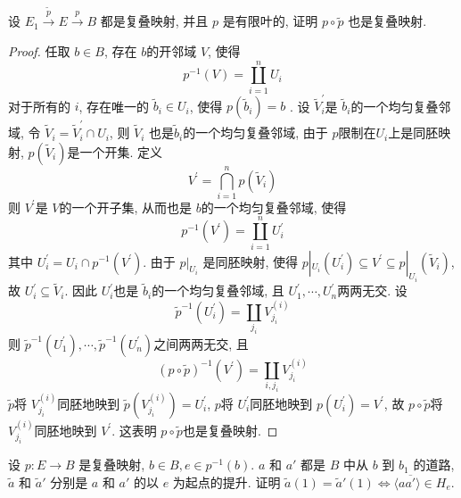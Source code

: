\documentclass[../main.tex]{subfiles}
\begin{document}
\begin{exercise}{}{}
设 $E_1 \xrightarrow{\tilde{p}} E \xrightarrow{p} B$ 都是复叠映射, 并且 $p$ 是有限叶的, 证明 $p \circ \tilde{p}$ 也是复叠映射.
\end{exercise}
\begin{proof}
    任取 \(  b\in B  \), 存在 \(  b  \)的开邻域 \(  V  \), 使得 \[
    p^{-1} \left( V \right)= \coprod  _{i= 1}^{n}U_{i} 
    \]
   对于所有的 \(  i  \), 存在唯一的 \(  \tilde{b}_{i}\in U_{i} \), 使得 \(  p\left( \tilde{b}_{i} \right)= b   \)   .  设 \(  \tilde{V}_{i}^{\prime}   \)是 \(  \tilde{b}_{i}  \)的一个均匀复叠邻域, 令 \(  \tilde{V}_{i}= \tilde{V}_{i}^{\prime}\cap U_{i}   \), 则 \(  \tilde{V}_{i}  \)  也是\(  \tilde{b}_{i}  \)的一个均匀复叠邻域, 由于 \(  p  \)限制在\(  U_{i}  \)上是同胚映射,  \(  p\left( \tilde{V}_{i} \right)   \)是一个开集. 定义 \[
   V^{\prime} =\bigcap _{i= 1}^{n}p\left( \tilde{V}_{i} \right) 
   \]     则 \(  V^{\prime}   \)是 \(  V  \)的一个开子集, 从而也是 \(  b  \)的一个均匀复叠邻域, 使得 \[
   p^{-1} \left( V^{\prime}  \right)= \coprod  _{i= 1}^{n}U_{i}^{\prime}  
   \]其中 \(  U_{i}^{\prime} = U_{i}\cap p^{-1} \left( V^{\prime}  \right)   \).  由于 \(  p|_{U_{i}}  \) 是同胚映射, 使得 \(  p|_{U_{i}}\left( U_{i}^{\prime}  \right)\subseteq V^{\prime}\subseteq  p|_{U_{i}}\left( \tilde{V}_{i} \right)     \), 故 \(  U_{i}^{\prime} \subseteq \tilde{V}_{i}  \). 因此 \(  U_{i}^{\prime}   \)也是 \(  \tilde{b}_{i}  \)的一个均匀复叠邻域, 且 \(  U_1^{\prime} ,\cdots ,U_{n}^{\prime}   \)两两无交. 设 \[
   \tilde{p}^{-1} \left( U_{i}^{\prime}  \right)= \coprod  _{j_{i}}V^{\left( i \right) }_{j_{i}} 
   \]   则 \(  \tilde{p}^{-1} \left( U_{1}^{\prime}  \right),\cdots ,\tilde{p}^{-1} \left( U_{n}^{\prime}  \right)    \)之间两两无交, 且  \[
   \left( p\circ \tilde{p} \right)^{-1} \left( V^{\prime}  \right)= \coprod _{i, j_{i}}V_{j_{i}}^{\left( i \right) }
   \] \(  \tilde{p}  \)将 \(  V_{j_{i}}^{\left( i \right) }  \)同胚地映到 \(  \tilde{p}\left( V_{j_{i}}^{\left( i \right) } \right)=  U^{\prime} _{i}   \), \(  p  \)将 \(  U_{i}^{\prime}   \)同胚地映到 \(  p\left( U_{i}^{\prime}  \right)= V^{\prime}   \), 故 \(  p\circ \tilde{p}  \)将 \(  V_{j_{i}}^{\left( i \right) }  \)同胚地映到 \(  V^{\prime}   \). 这表明 \(  p\circ \tilde{p}  \)也是复叠映射.          
\end{proof}

\begin{exercise}{}{}
设 $p: E \to B$ 是复叠映射, $b \in B, e \in p^{-1}(b)$. $a$ 和 $a'$ 都是 $B$ 中从 $b$ 到 $b_1$ 的道路, $\tilde{a}$ 和 $\tilde{a}'$ 分别是 $a$ 和 $a'$ 的以 $e$ 为起点的提升. 证明 $\tilde{a}(1)=\tilde{a}'(1) \iff \langle a \overline{a'} \rangle \in H_e$.
\end{exercise}
\end{document}

